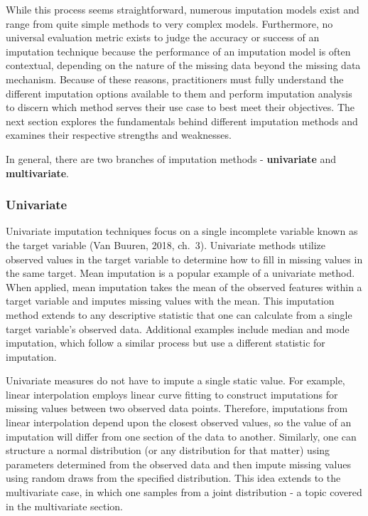 \documentclass[12pt,oneside]{chicagocapstone}
\begin{document}
While this process seems straightforward, numerous imputation models
exist and range from quite simple methods to very complex models.
Furthermore, no universal evaluation metric exists to judge the accuracy
or success of an imputation technique because the performance of an
imputation model is often contextual, depending on the nature of the
missing data beyond the missing data mechanism. Because of these
reasons, practitioners must fully understand the different imputation
options available to them and perform imputation analysis to discern
which method serves their use case to best meet their objectives. The
next section explores the fundamentals behind different imputation
methods and examines their respective strengths and weaknesses.

In general, there are two branches of imputation methods -
\textbf{univariate} and \textbf{multivariate}.

\subsubsection*{Univariate}\label{univariate}

Univariate imputation techniques focus on a single incomplete variable
known as the target variable (Van Buuren, 2018, ch.~3). Univariate
methods utilize observed values in the target variable to determine how
to fill in missing values in the same target. Mean imputation is a
popular example of a univariate method. When applied, mean imputation
takes the mean of the observed features within a target variable and
imputes missing values with the mean. This imputation method extends to
any descriptive statistic that one can calculate from a single target
variable's observed data. Additional examples include median and mode
imputation, which follow a similar process but use a different statistic
for imputation.

Univariate measures do not have to impute a single static value. For
example, linear interpolation employs linear curve fitting to construct
imputations for missing values between two observed data points.
Therefore, imputations from linear interpolation depend upon the closest
observed values, so the value of an imputation will differ from one
section of the data to another. Similarly, one can structure a normal
distribution (or any distribution for that matter) using parameters
determined from the observed data and then impute missing values using
random draws from the specified distribution. This idea extends to the
multivariate case, in which one samples from a joint distribution - a
topic covered in the multivariate section.
\end{document}
